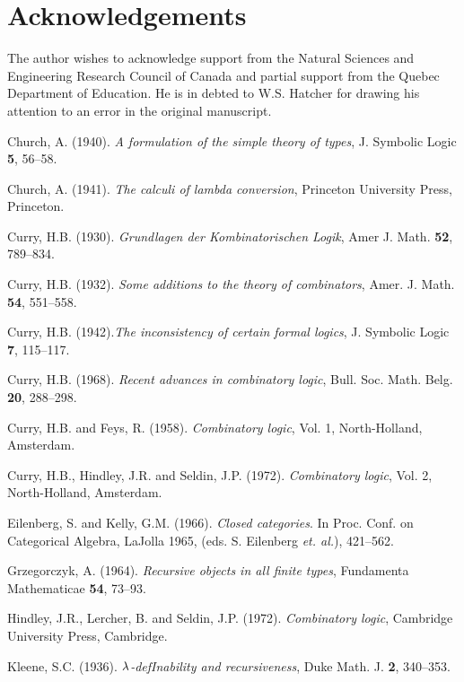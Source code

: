 \section*{Acknowledgements}

The author wishes to acknowledge support from the Natural Sciences and Engineering Research Council
of Canada and partial support from the Quebec Department of Education. He is in debted to W.S. Hatcher
for drawing his attention to an error in the original manuscript.

\def\bb#1{\bibitem[#1]{#1}}

\begin{thebibliography}{888}

\bb{1} Church, A. (1940). {\it A formulation of the simple theory of types}, J. Symbolic Logic {\bf 5}, 56--58.

\bb{2} Church, A. (1941). {\it The calculi of lambda conversion}, Princeton University Press, Princeton.

\bb{3} Curry, H.B. (1930). {\it Grundlagen der Kombinatorischen Logik}, Amer J. Math. {\bf 52}, 789--834.

\bb{4} Curry, H.B. (1932). {\it Some additions to the theory of combinators}, Amer. J. Math. {\bf 54}, 551--558.

\bb{5} Curry, H.B. (1942).{\it The inconsistency of certain formal logics}, J. Symbolic Logic {\bf 7}, 115--117.

\bb{6} Curry, H.B. (1968). {\it Recent advances in combinatory logic}, Bull. Soc. Math. Belg. {\bf 20}, 288--298.

\bb{7} Curry, H.B. and Feys, R. (1958). {\it Combinatory logic}, Vol. 1, North-Holland, Amsterdam.

\bb{8} Curry, H.B., Hindley, J.R. and Seldin, J.P. (1972). {\it Combinatory logic}, Vol. 2, North-Holland, Amsterdam.

\bb{9} Eilenberg, S. and Kelly, G.M. (1966). {\it Closed categories}. In Proc. Conf. on Categorical Algebra, LaJolla 1965,
 (eds. S. Eilenberg {\it et. al.}), 421--562.

\bb{10} Grzegorczyk, A. (1964). {\it Recursive objects in all finite types}, Fundamenta Mathematicae \textbf{54}, 73--93.

\bb{11} Hindley, J.R., Lercher, B. and Seldin, J.P. (1972). {\it Combinatory logic}, Cambridge University Press, Cambridge.

\bb{12} Kleene, S.C. (1936). {\it $\lambda$-defInability and recursiveness}, Duke Math. J. \textbf{2}, 340--353.


\end{thebibliography}
